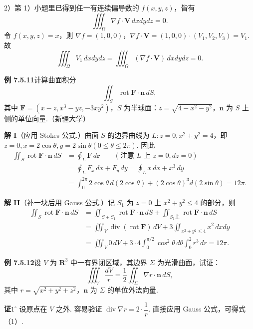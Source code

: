 \documentclass[UTF8, 12pt, fontset=fandol, oneside]{ctexart}
\begin{document}
2）第 1）小题里已得到任一有连续偏导数的 $f(x,y,z)$，皆有
\[
\iiint_\Omega \nabla f\cdot\mathbf V\,dxdy dz=0.
\]
令 $f(x,y,z)=x$，则 $\nabla f=(1,0,0)$，$\nabla f\cdot\mathbf V=(1,0,0)\cdot(V_1,V_2,V_3)=V_1$. 故
\[
\iiint_\Omega V_1\,dxdy dz=\iiint_\Omega(\nabla f\cdot\mathbf V)\,dxdy dz=0.
\]

\noindent\textbf{例 7.5.11}\quad 计算曲面积分
\[
\iint_S\operatorname{rot}\mathbf F\cdot\mathbf n\,dS,
\]
其中 $\mathbf F=(x-z,x^3-yz,-3xy^2)$，$S$ 为半球面：$z=\sqrt{4-x^2-y^2}$，$\mathbf n$ 为 $S$ 上侧的单位向量.（新疆大学）

\noindent\textbf{解 I}\quad （应用 Stokes 公式.）曲面 $S$ 的边界曲线为 $L:z=0,x^2+y^2=4$，即 $z=0,x=2\cos\theta,y=2\sin\theta(0\leqslant\theta\leqslant2\pi)$. 因此
\[
\begin{aligned}
\iint_S\operatorname{rot}\mathbf F\cdot\mathbf n\,dS
&=\oint_L\mathbf F\,d\mathbf r\qquad(\text{注意 }L\text{ 上 }z=0,dz=0)\\
&=\oint_L F_x\,dx+F_y\,dy
=\oint_Lx\,dx+x^3\,dy\\
&=\int_0^{2\pi}2\cos\theta\,d(2\cos\theta)+(2\cos\theta)^3d(2\sin\theta)=12\pi.
\end{aligned}
\]

\noindent\textbf{解 II}\quad （补一块后用 Gauss 公式.）记 $S_1$ 为 $z=0$ 上 $x^2+y^2\leqslant4$ 的部分，则
\[
\begin{aligned}
\iint_S\operatorname{rot}\mathbf F\cdot\mathbf n\,dS
&=\iint_{S+S_1}\operatorname{rot}\mathbf F\cdot\mathbf n\,dS+\iint_{S_1上}\operatorname{rot}\mathbf F\cdot\mathbf n\,dS\\
&=\iiint_V\operatorname{div}(\operatorname{rot}\mathbf F)\,dV+3\iint_{x^2+y^2\leqslant4}x^2\,dxdy\\
&=\iiint_V0\,dV+3\cdot4\int_0^{\pi/2}\cos^2\theta\,d\theta\int_0^2r^3\,dr=12\pi.
\end{aligned}
\]

\noindent\textbf{例 7.5.12}\quad 设 $V$ 为 $\mathbf R^3$ 中一有界闭区域，其边界 $\Sigma$ 为光滑曲面，试证：
\[
\iiint_V\frac{dV}{r}=\frac12\iint_\Sigma\nabla r\cdot\mathbf n\,dS, \tag{1}
\]
其中 $r=\sqrt{x^2+y^2+z^2}$，$\mathbf n$ 为 $\Sigma$ 的单位外法向量.

\noindent\textbf{证}\quad $1^\circ$ 设原点在 $V$ 之外. 容易验证 $\operatorname{div}\nabla r=2\cdot\dfrac1r$. 直接应用 Gauss 公式，可得式（1）.
\end{document}

